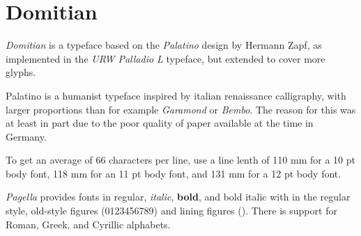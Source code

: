 \switchtobodyfont[domitian,10pt]
\chapter[domitian]{Domitian}

{\it Domitian} is a typeface based on the {\it Palatino} design by Hermann Zapf, as implemented in the {\it URW Palladio L} typeface, but extended to cover more glyphs.

Palatino is a humanist typeface inspired by italian renaissance calligraphy, with larger proportions than for example {\it Garamond} or {\it Bembo}. The reason for this was at least in part due to the poor quality of paper available at the time in Germany.

To get an average of 66 characters per line, use a line lenth of 110 mm for a 10 pt body font, 118 mm for an 11 pt body font, and 131 mm for a 12 pt body font.

{\it Pagella} provides fonts in regular, {\it italic}, {\bf bold}, and {\bi bold italic} with  \hairspace in the regular style, old-style figures (0123456789) and lining figures ({}). There is support for Roman, Greek, and Cyrillic alphabets.




